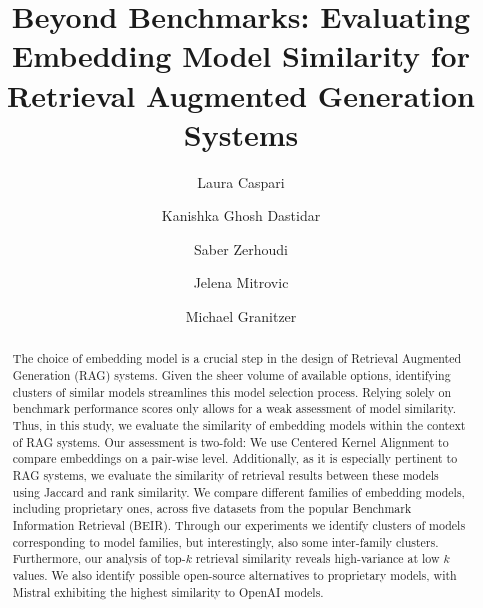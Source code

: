 \documentclass[nonacm,sigconf]{acmart}
\begin{document}
\title{Beyond Benchmarks: Evaluating Embedding Model Similarity for Retrieval Augmented Generation Systems}


\author{Laura Caspari}

\author{Kanishka Ghosh Dastidar}

\author{Saber Zerhoudi}

\author{Jelena Mitrovic}

\author{Michael Granitzer}

\renewcommand{\shortauthors}{Caspari et al.}

\begin{abstract}
   The choice of embedding model is a crucial step in the design of Retrieval Augmented Generation (RAG) systems. Given the sheer volume of available options, identifying clusters of similar models streamlines this model selection process. Relying solely on benchmark performance scores only allows for a weak assessment of model similarity. Thus, in this study, we evaluate the similarity of embedding models within the context of RAG systems. Our assessment is two-fold: We use Centered Kernel Alignment to compare embeddings on a pair-wise level. Additionally, as it is especially pertinent to RAG systems, we evaluate the similarity of retrieval results between these models using Jaccard and rank similarity. We compare different families of embedding models, including proprietary ones, across five datasets from the popular Benchmark Information Retrieval (BEIR). Through our experiments we identify clusters of models corresponding to model families, but interestingly, also some inter-family clusters. Furthermore, our analysis of top-$k$ retrieval similarity reveals high-variance at low $k$ values. We also identify possible open-source alternatives to proprietary models, with Mistral exhibiting the highest similarity to OpenAI models. 
\end{abstract}
\end{document}
